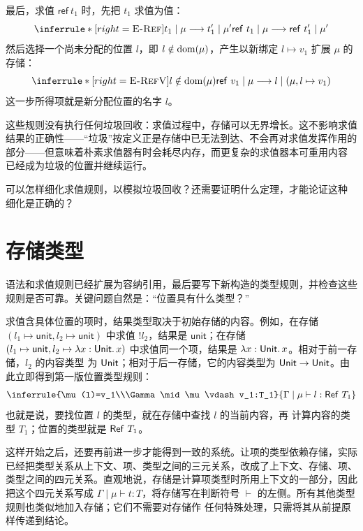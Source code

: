 最后，求值 \(\mathsf{ref}\ t_1\) 时，先把 \(t_1\) 求值为值：
\[
\inferrule*[right=\textsc{E-Ref}]
 {t_1\mid\mu\trans t_1'\mid\mu'}
 {\mathsf{ref}\ t_1\mid\mu\trans\mathsf{ref}\ t_1'\mid\mu'}
\]
然后选择一个尚未分配的位置 \(l\)，即 \(l\notin\operatorname{dom}(\mu)\)，产生以新绑定
\(l\mapsto v_1\) 扩展 \(\mu\) 的存储：
\[
\inferrule*[right=\textsc{E-RefV}]
 {l\notin\dom(\mu)}
 {\mathsf{ref}\ v_1\mid\mu\trans l\mid(\mu,l\mapsto v_1)}
\]
这一步所得项就是新分配位置的名字 \(l\)。

这些规则没有执行任何垃圾回收：求值过程中，存储可以无界增长。这不影响求值
结果的正确性——“垃圾”按定义正是存储中已无法到达、不会再对求值发挥作用的
部分——但意味着朴素求值器有时会耗尽内存，而更复杂的求值器本可重用内容
已经成为垃圾的位置并继续运行。

\begin{exercise}[\(\star\star\star\)]
\label{ex:13.3.1}
可以怎样细化求值规则，以模拟垃圾回收？还需要证明什么定理，才能论证这种
细化是正确的？
\end{exercise}

\section{存储类型}
\label{sec:13.4}

语法和求值规则已经扩展为容纳引用，最后要写下新构造的类型规则，并检查这些
规则是否可靠。关键问题自然是：“位置具有什么类型？”

求值含具体位置的项时，结果类型取决于初始存储的内容。例如，在存储
\((l_1\mapsto\mathsf{unit},l_2\mapsto\mathsf{unit})\) 中求值
\(!l_2\)，结果是 \(\mathsf{unit}\)；在存储
\((l_1\mapsto\mathsf{unit},
l_2\mapsto\lambda x:\mathsf{Unit}.\,x)\) 中求值同一个项，结果是
\(\lambda x:\mathsf{Unit}.\,x\)。相对于前一存储，\(l_2\) 的内容类型
为 \(\mathsf{Unit}\)；相对于后一存储，它的内容类型为
\(\mathsf{Unit}\to\mathsf{Unit}\)。由此立即得到第一版位置类型规则：
\[
\inferrule
 {\mu(l)=v_1\\\Gamma\mid\mu\vdash v_1:T_1}
 {\Gamma\mid\mu\vdash l:\tapltype{Ref}\ T_1}
\]
也就是说，要找位置 \(l\) 的类型，就在存储中查找 \(l\) 的当前内容，再
计算内容的类型 \(T_1\)；位置的类型就是 \(\mathsf{Ref}\ T_1\)。

这样开始之后，还要再前进一步才能得到一致的系统。让项的类型依赖存储，实际
已经把类型关系从上下文、项、类型之间的三元关系，改成了上下文、存储、项、
类型之间的四元关系。直观地说，存储是计算项类型时所用上下文的一部分，因此
把这个四元关系写成 \(\Gamma\mid\mu\vdash t:T\)，将存储写在判断符号
\(\vdash\) 的左侧。所有其他类型规则也类似地加入存储；它们不需要对存储作
任何特殊处理，只需将其从前提原样传递到结论。

